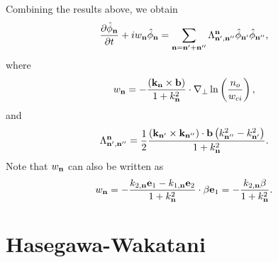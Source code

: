 \documentclass[oneside,a4paper,11pt]{report}
\begin{document}
Combining the results above, we obtain
\begin{equation}
    \frac{\partial \hat{\phi}_{\mathbf{n}}}{\partial t} + i w_{\mathbf{n}} \hat{\phi}_{\mathbf{n}} = \sum_{\mathbf{n} = \mathbf{n}' + \mathbf{n}''} \Lambda^{\mathbf{n}}_{\mathbf{n}', \mathbf{n}''} \hat{\phi}_{\mathbf{n}'} \hat{\phi}_{\mathbf{n}''},
\end{equation}
where
\begin{equation}
    w_{\mathbf{n}} = - \frac{ \left (\mathbf{k}_{\mathbf{n}} \times \mathbf{b} \right ) }{1 + k^2_{\mathbf{n}}} \cdot \nabla_\perp \ln \left ( \frac{n_o}{w_{ci}} \right ),
\end{equation}
and
\begin{equation}
    \Lambda^{\mathbf{n}}_{\mathbf{n}', \mathbf{n}''} = \frac{1}{2} \frac{  \left ( \mathbf{k}_{\mathbf{n}'} \times \mathbf{k}_{\mathbf{n}''} \right ) \cdot \mathbf{b} \left ( k^2_{\mathbf{n}''} - k^2_{\mathbf{n}'} \right ) }{1 + k^2_{\mathbf{n}}}.
\end{equation}
Note that $w_{\mathbf{n}}$ can also be written as
\begin{equation}
    w_{\mathbf{n}} = -\frac{k_{2,\mathbf{n}} \mathbf{e}_1 - k_{1,\mathbf{n}} \mathbf{e}_2}{1 + k^2_{\mathbf{n}}} \cdot \beta \mathbf{e}_1 = -\frac{k_{2,\mathbf{n}} \beta}{1 + k^2_{\mathbf{n}}}.
\end{equation}

\section{Hasegawa-Wakatani}
\end{document}
